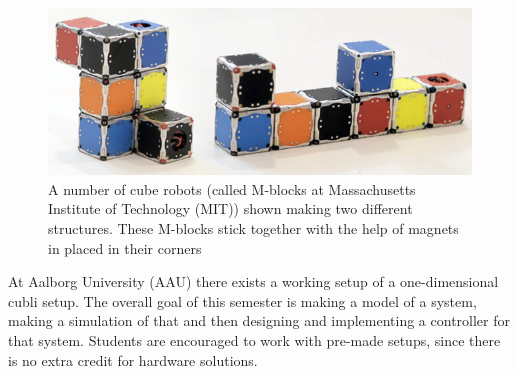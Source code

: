 \begin{figure}[H] 
	\centering 
	\includegraphics[scale=0.4]{figures/m-blocks}
	\caption{A number of cube robots (called M-blocks at Massachusetts Institute of Technology (MIT)) shown making two different structures. These M-blocks stick together with the help of magnets in placed in their corners\cite{LRosen}}
	\label{MBlocksExample}
\end{figure} 
At Aalborg University (AAU) there exists a working setup of a one-dimensional cubli setup. The overall goal of this semester is making a model of a system, making a simulation of that and then designing and implementing a controller for that system. Students are encouraged to work with pre-made setups, since there is no extra credit for hardware solutions.






